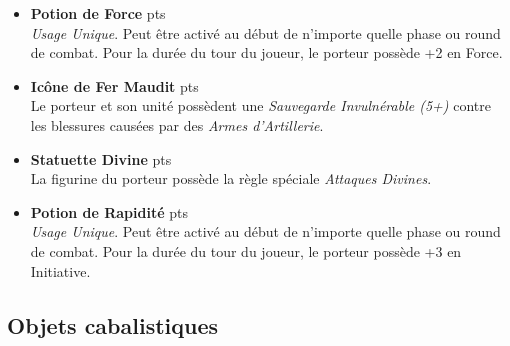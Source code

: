\begin{multicols}{2}
\begin{itemize}[label={-}]
\item \textbf{Potion de Force}  {pts} \\
\emph{Usage Unique}. Peut être activé au début de n'importe quelle phase ou round de combat. Pour la durée du tour du joueur, le porteur possède +2 en Force.

\item \textbf{Icône de Fer Maudit}  {pts} \\
Le porteur et son unité possèdent une \emph{Sauvegarde Invulnérable (5+)} contre les blessures causées par des \emph{Armes d'Artillerie}.

\item \textbf{Statuette Divine}  {pts} \\
La figurine du porteur possède la règle spéciale \emph{Attaques Divines}.

\item \textbf{Potion de Rapidité}  {pts} \\
\emph{Usage Unique}. Peut être activé au début de n'importe quelle phase ou round de combat. Pour la durée du tour du joueur, le porteur possède +3 en Initiative.

\end{itemize}
\end{multicols}

\newpage

\subsection{Objets cabalistiques}


